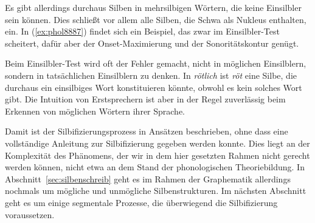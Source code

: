 Es gibt allerdings durchaus Silben in mehrsilbigen Wörtern, die keine Einsilbler sein können.
Dies schließt vor allem alle Silben, die Schwa als Nukleus enthalten, ein.
In (\ref{ex:phol8887}) findet sich ein Beispiel, das zwar im Einsilbler-Test scheitert, dafür aber der Onset-Maximierung und der Sonoritätskontur genügt.

\begin{exe}
\end{exe}

Beim Einsilbler-Test wird oft der Fehler gemacht, nicht in möglichen Einsilblern, sondern in tatsächlichen Einsilblern zu denken.
In \textit{rötlich} ist \textit{röt} eine Silbe, die durchaus ein einsilbiges Wort konstituieren könnte, obwohl es kein solches Wort gibt.
Die Intuition von Erstsprechern ist aber in der Regel zuverlässig beim Erkennen von möglichen Wörtern ihrer Sprache.

Damit ist der Silbifizierungsprozess in Ansätzen beschrieben, ohne dass eine vollständige Anleitung zur Silbifizierung gegeben werden konnte.
Dies liegt an der Komplexität des Phänomens, der wir in dem hier gesetzten Rahmen nicht gerecht werden können, nicht etwa an dem Stand der phonologischen Theoriebildung.
In Abschnitt~\ref{sec:silbenschreib} geht es im Rahmen der Graphematik allerdings nochmals um mögliche und unmögliche Silbenstrukturen.
Im nächsten Abschnitt geht es um einige segmentale Prozesse, die überwiegend die Silbifizierung voraussetzen.


